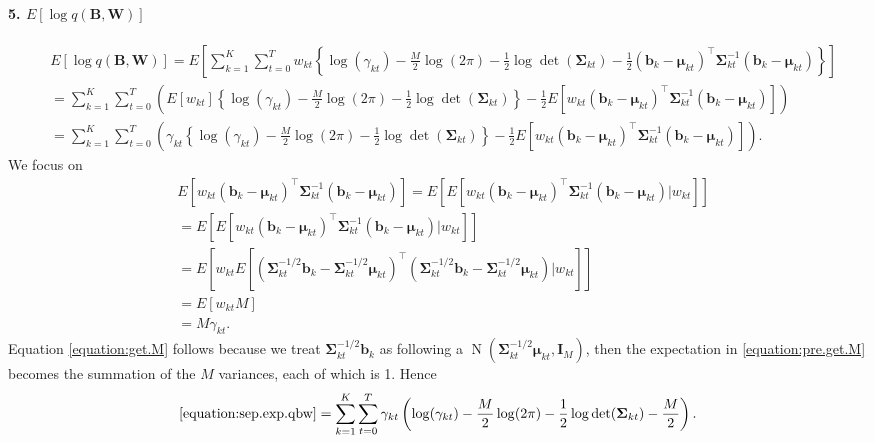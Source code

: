 \documentclass[11pt,authoryear]{article}
\DeclareMathOperator*{\N}{N}
\newcommand{\bs}[1]{\boldsymbol{#1}}
\begin{document}
\paragraph{5. $E[\log q(\bs{B}, \bs{W})]$}
\begin{align}
&E[\log q(\bs{B}, \bs{W})] = E\left[\sum_{k = 1}^K \sum_{t = 0}^T w_{kt}\left\{\log(\gamma_{kt}) - \frac{M}{2}\log(2\pi) - \frac{1}{2}\log\det(\bs{\Sigma}_{kt}) - \frac{1}{2}\left(\bs{b}_k - \bs{\mu}_{kt}\right)^{\intercal}\bs{\Sigma}_{kt}^{-1}\left(\bs{b}_k - \bs{\mu}_{kt}\right)\right\}\right]\\
&=\sum_{k = 1}^K \sum_{t = 0}^T \left(E\left[w_{kt}\right]\left\{\log(\gamma_{kt}) - \frac{M}{2}\log(2\pi) - \frac{1}{2}\log\det(\bs{\Sigma}_{kt})\right\} - \frac{1}{2}E\left[w_{kt}\left(\bs{b}_k - \bs{\mu}_{kt}\right)^{\intercal}\bs{\Sigma}_{kt}^{-1}\left(\bs{b}_k - \bs{\mu}_{kt}\right)\right]\right)\\
\label{equation:sep.exp.qbw}&=\sum_{k = 1}^K \sum_{t = 0}^T \left(\gamma_{kt}\left\{\log(\gamma_{kt}) - \frac{M}{2}\log(2\pi) - \frac{1}{2}\log\det(\bs{\Sigma}_{kt})\right\} - \frac{1}{2}E\left[w_{kt}\left(\bs{b}_k - \bs{\mu}_{kt}\right)^{\intercal}\bs{\Sigma}_{kt}^{-1}\left(\bs{b}_k - \bs{\mu}_{kt}\right)\right]\right).
\end{align}
We focus on
\begin{align}
&E\left[w_{kt}\left(\bs{b}_k - \bs{\mu}_{kt}\right)^{\intercal}\bs{\Sigma}_{kt}^{-1}\left(\bs{b}_k - \bs{\mu}_{kt}\right)\right] = E\left[E\left[w_{kt}\left(\bs{b}_k - \bs{\mu}_{kt}\right)^{\intercal}\bs{\Sigma}_{kt}^{-1}\left(\bs{b}_k - \bs{\mu}_{kt}\right)|w_{kt}\right]\right]\\
&= E\left[E\left[w_{kt}\left(\bs{b}_k - \bs{\mu}_{kt}\right)^{\intercal}\bs{\Sigma}_{kt}^{-1}\left(\bs{b}_k - \bs{\mu}_{kt}\right)|w_{kt}\right]\right]\\
\label{equation:pre.get.M}&= E\left[w_{kt}E\left[\left(\bs{\Sigma}_{kt}^{-1/2}\bs{b}_k - \bs{\Sigma}_{kt}^{-1/2}\bs{\mu}_{kt}\right)^{\intercal}\left(\bs{\Sigma}_{kt}^{-1/2}\bs{b}_k - \bs{\Sigma}_{kt}^{-1/2}\bs{\mu}_{kt}\right)|w_{kt}\right]\right]\\
\label{equation:get.M}&= E\left[w_{kt}M\right]\\
&= M\gamma_{kt}.
\end{align}
Equation \eqref{equation:get.M} follows because we treat
$\bs{\Sigma}_{kt}^{-1/2}\bs{b}_k$ as following a
$\N(\bs{\Sigma}_{kt}^{-1/2}\bs{\mu}_{kt}, \bs{I}_M)$, then the
expectation in \eqref{equation:pre.get.M} becomes the summation of the
$M$ variances, each of which is 1. Hence
\begin{align}
\eqref{equation:sep.exp.qbw} =\sum_{k = 1}^K \sum_{t = 0}^T \gamma_{kt}\left(\log(\gamma_{kt}) - \frac{M}{2}\log(2\pi) - \frac{1}{2}\log\det(\bs{\Sigma}_{kt}) - \frac{M}{2}\right).
\end{align}
\end{document}
